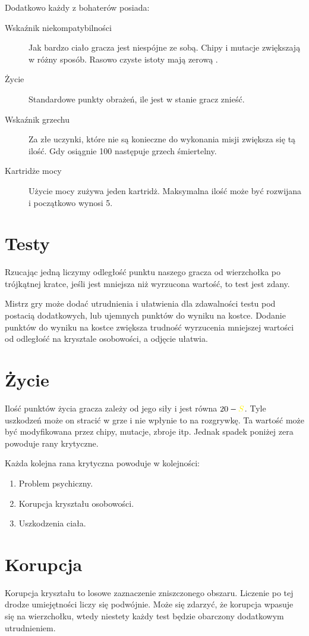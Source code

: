 Dodatkowo każdy z bohaterów posiada:
\begin{description}
 \item [Wskaźnik niekompatybilności \abnkp] Jak bardzo ciało gracza jest niespójne ze sobą. Chipy i mutacje zwiększają \abnkp w różny sposób. Rasowo czyste istoty mają zerową \abnkp.
 \item [Życie \abzyc] Standardowe punkty obrażeń, ile jest w stanie gracz znieść.
 \item [Wskaźnik grzechu \abgrz] Za złe uczynki, które nie są konieczne do wykonania misji zwiększa się tą ilość. Gdy osiągnie 100 następuje grzech śmiertelny.
 \item [Kartridże mocy \abkar] Użycie mocy zużywa jeden kartridż. Maksymalna ilość może być rozwijana i początkowo wynosi 5.
\end{description}

\section{Testy}
Rzucając jedną \dxx liczymy odległość punktu naszego gracza od wierzchołka po trójkątnej kratce, jeśli jest mniejsza niż wyrzucona wartość, to test jest zdany.

Mistrz gry może dodać utrudnienia i ułatwienia dla zdawalności testu pod postacią dodatkowych, lub ujemnych punktów do wyniku na kostce.
Dodanie punktów do wyniku na kostce zwiększa trudność wyrzucenia mniejszej wartości od odległość na krysztale osobowości, a odjęcie ułatwia.

\section{Życie}
Ilość punktów życia gracza zależy od jego siły i jest równa $20 - \abs$.
Tyle uszkodzeń może on stracić w grze i nie wpłynie to na rozgrywkę.
Ta wartość może być modyfikowana przez chipy, mutacje, zbroje itp.
Jednak spadek poniżej zera powoduje rany krytyczne.

Każda kolejna rana krytyczna powoduje w kolejności:
\begin{enumerate}
\item Problem psychiczny.
\item Korupcja kryształu osobowości.
\item Uszkodzenia ciała.
\end{enumerate}

\section{Korupcja}
Korupcja kryształu to losowe zaznaczenie zniszczonego obszaru.
Liczenie po tej drodze umiejętności liczy się podwójnie.
Może się zdarzyć, że korupcja wpasuje się na wierzchołku, wtedy niestety każdy test będzie obarczony dodatkowym utrudnieniem.

